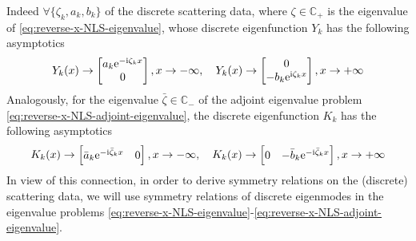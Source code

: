 Indeed $ \forall \{ \zeta_{k}, a_{k}, b_{k} \} $ of the discrete scattering data, where $ \zeta \in \mathbb{C_{+}} $ is the eigenvalue of \eqref{eq:reverse-x-NLS-eigenvalue}, whose discrete eigenfunction $ Y_{k} $ has the following asymptotics 
\begin{equation}
    Y_{k}(x) \to \begin{bmatrix} a_{k} \mathrm{e}^{-\mathrm{i} \zeta_{k} x} \\ 0 \end{bmatrix}, x \to -\infty, \quad Y_{k}(x) \to \begin{bmatrix} 0 \\ -b_{k} \mathrm{e}^{\mathrm{i} \zeta_{k} x} \end{bmatrix}, x \to +\infty \label{eq:large-x-asymptotics-of-reverse-x-NLS-eigenfunction}
\end{equation}
Analogously, for the eigenvalue $ \bar{\zeta} \in \mathbb{C_{-}} $ of the adjoint eigenvalue problem \eqref{eq:reverse-x-NLS-adjoint-eigenvalue}, the discrete eigenfunction $ K_{k} $ has the following asymptotics 
\begin{equation}
    K_{k}(x) \to \begin{bmatrix} \bar{a}_{k} \mathrm{e}^{-\mathrm{i} \bar{\zeta}_{k} x} & 0 \end{bmatrix}, x \to -\infty, \quad K_{k}(x) \to \begin{bmatrix} 0 & -\bar{b}_{k}\mathrm{e}^{-\mathrm{i} \bar{\zeta}_{k}x} \end{bmatrix}, x \to +\infty \label{eq:large-x-asymptotics-of-reverse-x-NLS-adjoint-eigenfunction}
\end{equation}
In view of this connection, in order to derive symmetry relations on the (discrete) scattering data, we will use symmetry relations of discrete eigenmodes in the eigenvalue problems \eqref{eq:reverse-x-NLS-eigenvalue}-\eqref{eq:reverse-x-NLS-adjoint-eigenvalue}.

